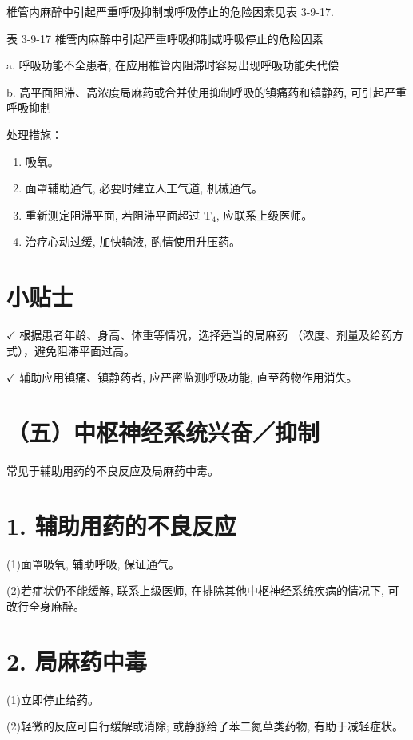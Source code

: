 \documentclass[10pt]{article}
\begin{document}
椎管内麻醉中引起严重呼吸抑制或呼吸停止的危险因素见表 3-9-17.

表 3-9-17 椎管内麻醉中引起严重呼吸抑制或呼吸停止的危险因素

a. 呼吸功能不全患者, 在应用椎管内阻滞时容易出现呼吸功能失代偿

b. 高平面阻滞、高浓度局麻药或合并使用抑制呼吸的镇痛药和镇静药, 可引起严重呼吸抑制

处理措施：

\begin{enumerate}
  \item 吸氧。

  \item 面罩辅助通气, 必要时建立人工气道, 机械通气。

  \item 重新测定阻滞平面, 若阻滞平面超过 $\mathrm{T}_{4}$, 应联系上级医师。

  \item 治疗心动过缓, 加快输液, 酌情使用升压药。

\end{enumerate}

\section*{小贴士}
$\checkmark$ 根据患者年龄、身高、体重等情况，选择适当的局麻药 （浓度、剂量及给药方式），避免阻滞平面过高。

$\checkmark$ 辅助应用镇痛、镇静药者, 应严密监测呼吸功能, 直至药物作用消失。

\section*{（五）中枢神经系统兴奋／抑制}
常见于辅助用药的不良反应及局麻药中毒。

\section*{1. 辅助用药的不良反应}
(1)面罩吸氧, 辅助呼吸, 保证通气。

(2)若症状仍不能缓解, 联系上级医师, 在排除其他中枢神经系统疾病的情况下, 可改行全身麻醉。

\section*{2. 局麻药中毒}
(1)立即停止给药。

(2)轻微的反应可自行缓解或消除; 或静脉给了苯二氮草类药物, 有助于减轻症状。
\end{document}
